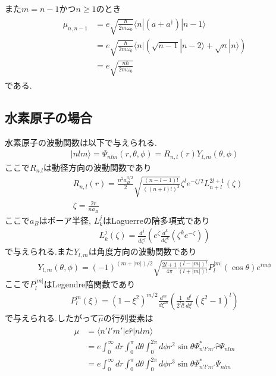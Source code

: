 \documentclass[uplatex,a4j,11pt,dvipdfmx]{jsarticle}
\begin{document}
また$m=n-1$かつ$n\geq1$のとき
\begin{align}
  \begin{split}
    \mu_{n,n-1}&=e\sqrt{\frac{\hbar}{2m\omega_0}}\langle n|\left(a+a^\dag\right)|n-1\rangle\\
    &=e\sqrt{\frac{\hbar}{2m\omega_0}}\langle n|\left(\sqrt{n-1}|n-2\rangle+\sqrt{n}|n\rangle\right)\\
    &=e\sqrt{\frac{n\hbar}{2m\omega_0}}
  \end{split}
\end{align}
である.
\subsection*{水素原子の場合}
水素原子の波動関数は以下で与えられる.\cite{alma990023810940204034}
\begin{align}
  |nlm\rangle=\Psi_{nlm}(r,\theta,\phi)=R_{n,l}(r)Y_{l,m}(\theta,\phi)
\end{align}
ここで$R_{n.l}$は動径方向の波動関数であり
\begin{align}
  &R_{n,l}(r)=\frac{n^2a_B^{3/2}}{2}\sqrt{\frac{(n-l-1)!}{\left((n+l)!\right)^3}}\zeta^le^{-\zeta/2}L^{2l+1}_{n+l}(\zeta)\\
  &\zeta=\frac{2r}{na_B}
\end{align}
ここで$a_B$はボーア半径, $L^j_k$はLaguerreの陪多項式であり
\begin{align}
  L^j_k(\zeta)=\frac{d^j}{d\zeta^j}\left(e^\zeta\frac{d^k}{d\zeta^k}(\zeta^ke^{-\zeta})\right)
\end{align}
で与えられる.また$Y_{l,m}$は角度方向の波動関数であり
\begin{align}
  Y_{l,m}(\theta,\phi)=(-1)^{(m+|m|)/2}\sqrt{\frac{2l+1}{4\pi}\frac{(l-|m|)!}{(l+|m|)!}}P^{|m|}_l(\cos\theta)e^{im\phi}
\end{align}
ここで$P_l^{|m|}$はLegendre陪関数であり
\begin{align}
  P^m_l(\xi)=(1-\xi^2)^{m/2}\frac{d^m}{d\xi^m}\left(\frac{1}{2^ll!}\frac{d^l}{d\xi^l}(\xi^2-1)^l\right)
\end{align}
で与えられる.したがって$\hat{\mu}$の行列要素は
\begin{align}
  \begin{split}
    \mu&=\langle n'l'm'|e\hat{r}|nlm\rangle\\
    &=e\int_0^\infty dr\int_0^\pi d\theta\int_0^{2\pi}d\phi r^2\sin\theta \Psi_{n'l'm'}^*\hat{r}\Psi_{nlm}\\
    &=e\int_0^\infty dr\int_0^\pi d\theta\int_0^{2\pi}d\phi r^3\sin\theta \Psi_{n'l'm'}^*\Psi_{nlm}\\
  \end{split}
\end{align}
\end{document}
